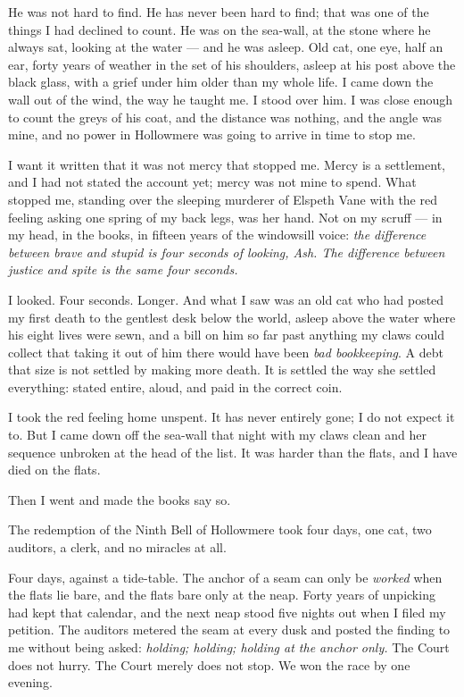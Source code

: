 He was not hard to find. He has never been hard to find; that was one of the things I had declined to count. He was on the sea-wall, at the stone where he always sat, looking at the water --- and he was asleep. Old cat, one eye, half an ear, forty years of weather in the set of his shoulders, asleep at his post above the black glass, with a grief under him older than my whole life. I came down the wall out of the wind, the way he taught me. I stood over him. I was close enough to count the greys of his coat, and the distance was nothing, and the angle was mine, and no power in Hollowmere was going to arrive in time to stop me.

I want it written that it was not mercy that stopped me. Mercy is a settlement, and I had not stated the account yet; mercy was not mine to spend. What stopped me, standing over the sleeping murderer of Elspeth Vane with the red feeling asking one spring of my back legs, was her hand. Not on my scruff --- in my head, in the books, in fifteen years of the windowsill voice: \emph{the difference between brave and stupid is four seconds of looking, Ash. The difference between justice and spite is the same four seconds.}

I looked. Four seconds. Longer. And what I saw was an old cat who had posted my first death to the gentlest desk below the world, asleep above the water where his eight lives were sewn, and a bill on him so far past anything my claws could collect that taking it out of him there would have been \emph{bad bookkeeping}. A debt that size is not settled by making more death. It is settled the way she settled everything: stated entire, aloud, and paid in the correct coin.

I took the red feeling home unspent. It has never entirely gone; I do not expect it to. But I came down off the sea-wall that night with my claws clean and her sequence unbroken at the head of the list. It was harder than the flats, and I have died on the flats.

Then I went and made the books say so.

\scenebreak

The redemption of the Ninth Bell of Hollowmere took four days, one cat, two auditors, a clerk, and no miracles at all.

Four days, against a tide-table. The anchor of a seam can only be \emph{worked} when the flats lie bare, and the flats bare only at the neap. Forty years of unpicking had kept that calendar, and the next neap stood five nights out when I filed my petition. The auditors metered the seam at every dusk and posted the finding to me without being asked: \emph{holding; holding; holding at the anchor only.} The Court does not hurry. The Court merely does not stop. We won the race by one evening.

